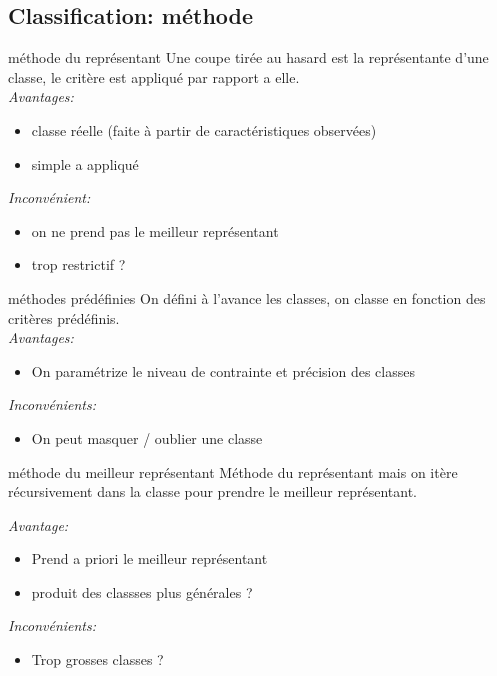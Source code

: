 \documentclass[aspectratio=169]{beamer}
\begin{document}
    \subsection{Classification: méthode}
    \begin{frame}{méthode du représentant}
        Une coupe tirée au hasard est la représentante d'une classe, le critère est appliqué par rapport a elle.\\
        \emph{Avantages:}
        \begin{itemize}
            \item classe réelle (faite à partir de caractéristiques observées)
            \item simple a appliqué
        \end{itemize}
        \emph{Inconvénient:}
        \begin{itemize}
            \item on ne prend pas le meilleur représentant
            \item trop restrictif ?
        \end{itemize}
    \end{frame}

    \begin{frame}{méthodes prédéfinies}
        On défini à l'avance les classes, on classe en fonction des critères prédéfinis.\\
        \emph{Avantages:}
        \begin{itemize}
            \item On paramétrize le niveau de contrainte et précision des classes
        \end{itemize}
        \emph{Inconvénients:}
        \begin{itemize}
            \item On peut masquer / oublier une classe
        \end{itemize}
    \end{frame}

    \begin{frame}{méthode du meilleur représentant}
        Méthode du représentant mais on itère récursivement dans la classe pour prendre le meilleur représentant.

        \emph{Avantage:}
        \begin{itemize}
            \item Prend a priori le meilleur représentant
            \item produit des classses plus générales ?
        \end{itemize}
        \emph{Inconvénients:}
        \begin{itemize}
            \item Trop grosses classes ?
        \end{itemize}
    \end{frame}
\end{document}
